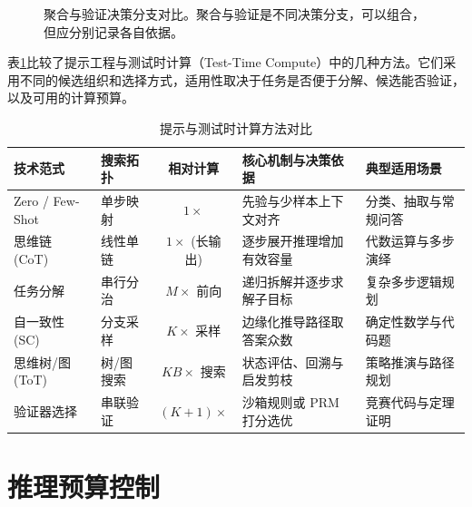 \documentclass[../textbook.tex]{subfiles}
\begin{document}
\begin{figure}[htbp]
\centering
{}
\caption[聚合与验证决策分支对比]{聚合与验证决策分支对比。聚合与验证是不同决策分支，可以组合，但应分别记录各自依据。}\label{fig:icl-selection-flow}
\end{figure}

表\ref{tab:prompt-taxonomy}比较了提示工程与测试时计算（Test-Time Compute）中的几种方法。它们采用不同的候选组织和选择方式，适用性取决于任务是否便于分解、候选能否验证，以及可用的计算预算。

\begin{table}[htbp]
\centering
\footnotesize
\setlength{\tabcolsep}{3pt}
\caption{提示与测试时计算方法对比}
\label{tab:prompt-taxonomy}
\begin{tabularx}{\linewidth}{@{}p{20mm}p{16mm}cp{28mm}X@{}}
\toprule
技术范式 & 搜索拓扑 & 相对计算 & 核心机制与决策依据 & 典型适用场景 \\
\midrule
Zero / Few-Shot & 单步映射 & $1\times$ & 先验与少样本上下文对齐 & 分类、抽取与常规问答 \\
思维链 (CoT) & 线性单链 & $1\times$ (长输出) & 逐步展开推理增加有效容量 & 代数运算与多步演绎 \\
任务分解 & 串行分治 & $M\times$ 前向 & 递归拆解并逐步求解子目标 & 复杂多步逻辑规划 \\
自一致性 (SC) & 分支采样 & $K\times$ 采样 & 边缘化推导路径取答案众数 & 确定性数学与代码题 \\
思维树/图 (ToT) & 树/图搜索 & $KB\times$ 搜索 & 状态评估、回溯与启发剪枝 & 策略推演与路径规划 \\
验证器选择 & 串联验证 & $(K{+}1)\times$ & 沙箱规则或 PRM 打分选优 & 竞赛代码与定理证明 \\
\bottomrule
\end{tabularx}
\end{table}

\section{推理预算控制}
\end{document}

